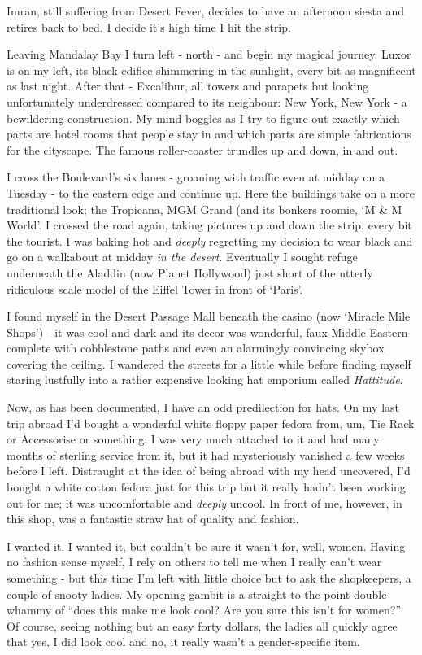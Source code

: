 \documentclass[a5paper,10pt,titlepage,draft]{book}
\begin{document}
Imran, still suffering from Desert Fever, decides to have an afternoon siesta and retires back to bed.  I decide it's high time I hit the strip.

Leaving Mandalay Bay I turn left - north - and begin my magical journey.  Luxor is on my left, its black edifice shimmering in the sunlight, every bit as magnificent as last night.  After that - Excalibur, all towers and parapets but looking unfortunately underdressed compared to its neighbour: New York, New York - a bewildering construction.  My mind boggles as I try to figure out exactly which parts are hotel rooms that people stay in and which parts are simple fabrications for the cityscape.  The famous roller-coaster trundles up and down, in and out.

I cross the Boulevard's six lanes - groaning with traffic even at midday on a Tuesday - to the eastern edge and continue up. Here the buildings take on a more traditional look; the Tropicana, MGM Grand (and its bonkers roomie, `M \& M World'.  I crossed the road again, taking pictures up and down the strip, every bit the tourist.  I was baking hot and \emph{deeply} regretting my decision to wear black and go on a walkabout at midday \emph{in the desert}.  Eventually I sought refuge underneath the Aladdin (now Planet Hollywood) just short of the utterly ridiculous scale model of the Eiffel Tower in front of `Paris'.

I found myself in the Desert Passage Mall beneath the casino (now `Miracle Mile Shops') - it was cool and dark and its decor was wonderful, faux-Middle Eastern complete with cobblestone paths and even an alarmingly convincing skybox covering the ceiling.  I wandered the streets for a little while before finding myself staring lustfully into a rather expensive looking hat emporium called \emph{Hattitude}.

Now, as has been documented, I have an odd predilection for hats.  On my last trip abroad I'd bought a wonderful white floppy paper fedora from, um, Tie Rack or Accessorise or something; I was very much attached to it and had many months of sterling service from it, but it had mysteriously vanished a few weeks before I left.  Distraught at the idea of being abroad with my head uncovered, I'd bought a white cotton fedora just for this trip but it really hadn't been working out for me; it was uncomfortable and \emph{deeply} uncool.  In front of me, however, in this shop, was a fantastic straw hat of quality and fashion.

I wanted it.  I wanted it, but couldn't be sure it wasn't for, well, women.  Having no fashion sense myself, I rely on others to tell me when I really can't wear something - but this time I'm left with little choice but to ask the shopkeepers, a couple of snooty ladies.  My opening gambit is a straight-to-the-point double-whammy of ``does this make me look cool?  Are you sure this isn't for women?''  Of course, seeing nothing but an easy forty dollars, the ladies all quickly agree that yes, I did look cool and no, it really wasn't a gender-specific item.
\end{document}
